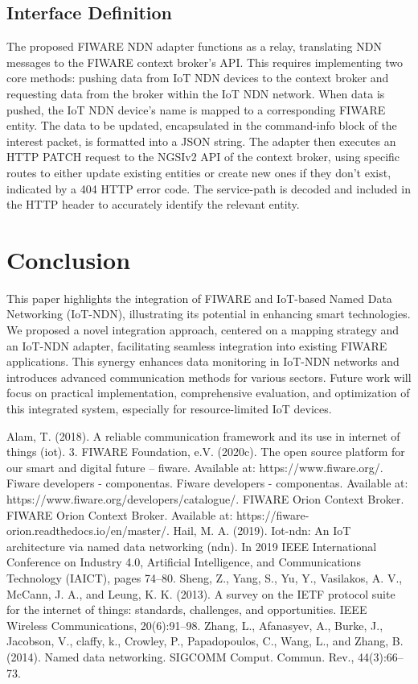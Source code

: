 \documentclass[conference]{IEEEtran}
\begin{document}
\subsection{Interface Definition}
The proposed FIWARE NDN adapter functions as a relay, translating NDN messages to the FIWARE context broker's API.
This requires implementing two core methods: pushing data from IoT NDN devices to the context broker and requesting data from the broker within the IoT NDN network.
When data is pushed, the IoT NDN device's name is mapped to a corresponding FIWARE entity.
The data to be updated, encapsulated in the command-info block of the interest packet, is formatted into a JSON string.
The adapter then executes an HTTP PATCH request to the NGSIv2 API of the context broker, using specific routes to either update existing entities or create new ones if they don't exist, indicated by a 404 HTTP error code.
The service-path is decoded and included in the HTTP header to accurately identify the relevant entity.

\section{Conclusion}
This paper highlights the integration of FIWARE and IoT-based Named Data Networking (IoT-NDN), illustrating its potential in enhancing smart technologies.
We proposed a novel integration approach, centered on a mapping strategy and an IoT-NDN adapter, facilitating seamless integration into existing FIWARE applications.
This synergy enhances data monitoring in IoT-NDN networks and introduces advanced communication methods for various sectors.
Future work will focus on practical implementation, comprehensive evaluation, and optimization of this integrated system, especially for resource-limited IoT devices.

\begin{thebibliography}{00}
     Alam, T. (2018). A reliable communication framework and its use in internet of things (iot). 3.
     FIWARE Foundation, e.V. (2020c). The open source platform for our smart and digital future – fiware. Available at: https://www.fiware.org/.
     Fiware developers - componentas. Fiware developers - componentas. Available at: https://www.fiware.org/developers/catalogue/.
     FIWARE Orion Context Broker. FIWARE Orion Context Broker. Available at: https://fiware-orion.readthedocs.io/en/master/.
     Hail, M. A. (2019). Iot-ndn: An IoT architecture via named data networking (ndn). In 2019 IEEE International Conference on Industry 4.0, Artificial Intelligence, and Communications Technology (IAICT), pages 74–80.
     Sheng, Z., Yang, S., Yu, Y., Vasilakos, A. V., McCann, J. A., and Leung, K. K. (2013). A survey on the IETF protocol suite for the internet of things: standards, challenges, and opportunities. IEEE Wireless Communications, 20(6):91–98.
     Zhang, L., Afanasyev, A., Burke, J., Jacobson, V., claffy, k., Crowley, P., Papadopoulos, C., Wang, L., and Zhang, B. (2014). Named data networking. SIGCOMM Comput. Commun. Rev., 44(3):66–73.
\end{thebibliography}
\end{document}
